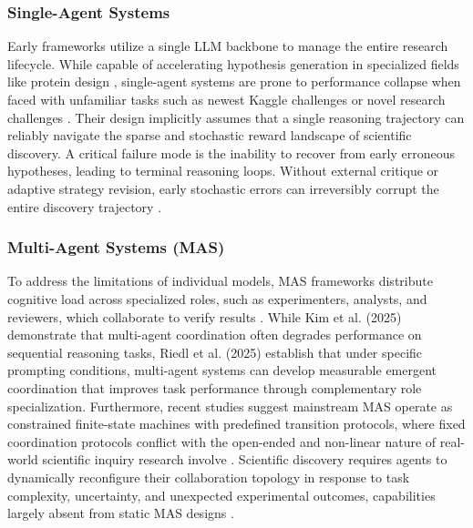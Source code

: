 \documentclass{article}
\begin{document}
\subsubsection{Single-Agent Systems}


Early frameworks utilize a single LLM backbone to manage the entire research lifecycle. While capable of accelerating hypothesis generation in specialized fields like protein design \cite{16_jacob_beyond_2025}, single-agent systems are prone to performance collapse when faced with unfamiliar tasks such as newest Kaggle challenges \cite{13_huang_mlagentbench_2024} or novel research challenges \cite{14_zhang_mlrc-bench_2025}.
Their design implicitly assumes that a single reasoning trajectory can reliably navigate the sparse and stochastic reward landscape of scientific discovery.
A critical failure mode is the inability to recover from early erroneous hypotheses, leading to terminal reasoning loops. Without external critique or adaptive strategy revision, early stochastic errors can irreversibly corrupt the entire discovery trajectory \cite{zhou2025autonomousagentsscientificdiscovery}.

\subsubsection{Multi-Agent Systems (MAS)}


To address the limitations of individual models, MAS frameworks distribute cognitive load across specialized roles, such as experimenters, analysts, and reviewers, which collaborate to verify results \cite{20_team_internagent_2025}.  While Kim et al. (2025) \cite{21_kim_towards_2025} demonstrate that multi-agent coordination often degrades performance on sequential reasoning tasks, Riedl et al. (2025) \cite{riedl2025emergentcoordinationmultiagentlanguage} establish that under specific prompting conditions, multi-agent systems can develop measurable emergent coordination that improves task performance through complementary role specialization. 
Furthermore, recent studies suggest mainstream MAS operate as constrained finite-state machines with predefined transition protocols\cite{zhang2025metaagentautomaticallyconstructingmultiagent}, where fixed coordination protocols conflict with the open-ended and non-linear nature of real-world scientific inquiry research involve \cite{anthropic2025multiagentresearch}.
Scientific discovery requires agents to dynamically reconfigure their collaboration topology in response to task complexity, uncertainty, and unexpected experimental outcomes, capabilities largely absent from static MAS designs \cite{2_wei_ai_2025}.
\end{document}
